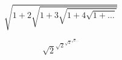 \documentclass[preview]{standalone}
\begin{document}
	\[ \sqrt{ 1 + 2 \sqrt { 1 + 3 \sqrt { 1 + 4 \sqrt { 1 + \ldots} } } }  \]

	\[ \sqrt{2}^{\sqrt{2}^{\sqrt{2}^{ \sqrt{2} \ldots } } } \]
\end{document}
